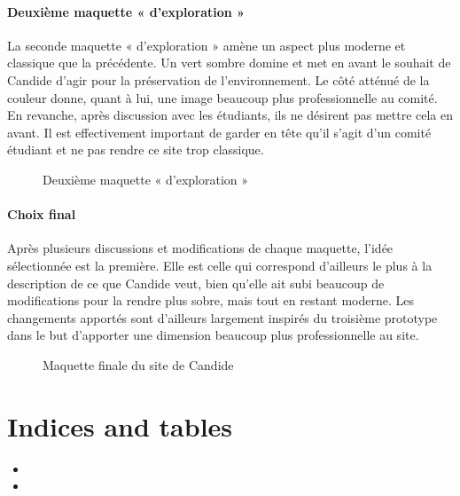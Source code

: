 \documentclass[a4,10pt,french]{sphinxmanual}
\begin{document}
\subsubsection{Deuxième maquette « d’exploration »}
\label{\detokenize{chapitre-06:deuxieme-maquette-dexploration}}
\sphinxAtStartPar
La seconde maquette « d’exploration » amène un aspect plus moderne et classique que la précédente. Un vert sombre domine et met en avant le souhait de Candide d’agir pour la préservation de l’environnement. Le côté atténué de la couleur donne, quant à lui, une image beaucoup plus professionnelle au comité.  En revanche, après discussion avec les étudiants, ils ne désirent pas mettre cela en avant. Il est effectivement important de garder en tête qu’il s’agit d’un comité étudiant et ne pas rendre ce site trop classique.

\begin{figure}[htbp]
\centering
\capstart

\noindent{}
\caption{Deuxième maquette « d’exploration »}\label{\detokenize{chapitre-06:id3}}\end{figure}


\subsubsection{Choix final}
\label{\detokenize{chapitre-06:choix-final}}
\sphinxAtStartPar
Après plusieurs discussions et modifications de chaque maquette, l’idée sélectionnée est la première. Elle est celle qui correspond d’ailleurs le plus à la description de ce que Candide veut, bien qu’elle ait subi beaucoup de modifications pour la rendre plus sobre, mais tout en restant moderne. Les changements apportés sont d’ailleurs largement inspirés du troisième prototype dans le but d’apporter une dimension beaucoup plus professionnelle au site.

\begin{figure}[htbp]
\centering
\capstart

\noindent{}
\caption{Maquette finale du site de Candide}\label{\detokenize{chapitre-06:id4}}\end{figure}


\chapter{Indices and tables}
\label{\detokenize{index:indices-and-tables}}\begin{itemize}
\item {} 
\sphinxAtStartPar
{}

\item {} 
\sphinxAtStartPar
{}

\end{itemize}



\renewcommand{\indexname}{Index}
\printindex
\end{document}
